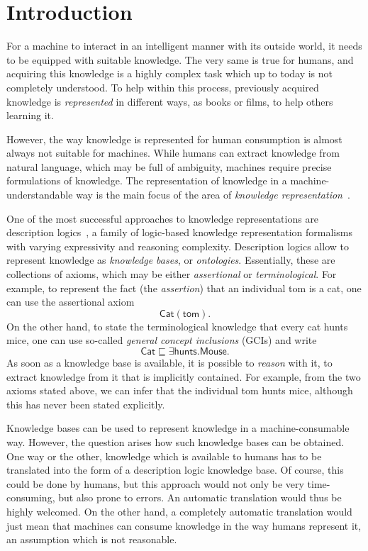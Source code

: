 \chapter{Introduction}
\label{cha:introduction}

For a machine to interact in an intelligent manner with its outside world, it needs to be
equipped with suitable knowledge.  The very same is true for humans, and acquiring this
knowledge is a highly complex task which up to today is not completely understood.  To
help within this process, previously acquired knowledge is \emph{represented} in different
ways, \eg as books or films, to help others learning it.

However, the way knowledge is represented for human consumption is almost always not
suitable for machines.  While humans can extract knowledge from natural language, which
may be full of ambiguity, machines require precise formulations of knowledge.  The
representation of knowledge in a machine-understandable way is the main focus of the area
of \emph{knowledge representation}~\cite{KRhandbook}.

One of the most successful approaches to knowledge representations are description
logics~\cite{DLhandbook}, a family of logic-based knowledge representation formalisms
with varying expressivity and reasoning complexity.  Description logics allow to represent
knowledge as \emph{knowledge bases}, or \emph{ontologies}.  Essentially, these are
collections of axioms, which may be either \emph{assertional} or \emph{terminological}.
For example, to represent the fact (the \emph{assertion}) that an individual \textsf{tom}
is a cat, one can use the assertional axiom
\begin{equation}
  \label{eq:14}
  \mathsf{Cat}(\mathsf{tom}).
\end{equation}
On the other hand, to state the terminological knowledge that every cat hunts mice, one
can use so-called \emph{general concept inclusions} (GCIs) and write
\begin{equation}
  \label{eq:15}
  \mathsf{Cat} \sqsubseteq \exists \mathsf{hunts}. \mathsf{Mouse}.
\end{equation}
As soon as a knowledge base is available, it is possible to \emph{reason} with it, \ie to
extract knowledge from it that is implicitly contained.  For example, from the two axioms
stated above, we can infer that the individual \textsf{tom} hunts mice, although this has
never been stated explicitly.

Knowledge bases can be used to represent knowledge in a machine-consumable way.  However,
the question arises how such knowledge bases can be obtained.  One way or the other,
knowledge which is available to humans has to be translated into the form of a description
logic knowledge base.  Of course, this could be done by humans, but this approach would
not only be very time-consuming, but also prone to errors.  An automatic translation would
thus be highly welcomed.  On the other hand, a completely automatic translation would just
mean that machines can consume knowledge in the way humans represent it, an assumption
which is not reasonable.

